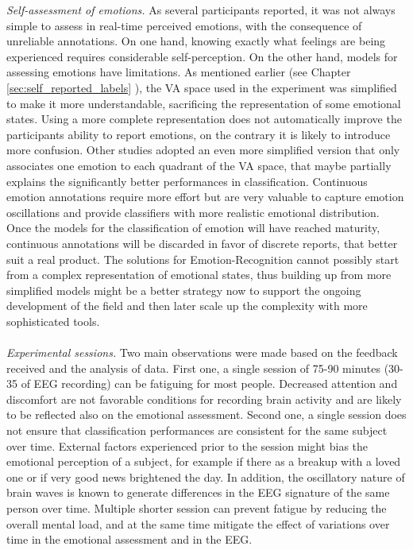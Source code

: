 \emph{Self-assessment of emotions.} As several participants reported, it was not always simple to assess in real-time perceived emotions, with the consequence of unreliable annotations. On one hand, knowing exactly what feelings are being experienced requires considerable self-perception. On the other hand, models for assessing emotions have limitations. As mentioned earlier (see Chapter \ref{sec:self_reported_labels} ), the \ac{VA} space used in the experiment was simplified to make it more understandable, sacrificing the representation of some emotional states. Using a more complete representation does not automatically improve the participants ability to report emotions, on the contrary it is likely to introduce more confusion. Other studies \cite{lin_eeg-based_2010} adopted an even more simplified version that only associates one emotion to each quadrant of the \ac{VA} space, that maybe partially explains the significantly better performances in classification. Continuous emotion annotations require more effort but are very valuable to capture emotion oscillations and provide classifiers with more realistic emotional distribution. Once the models for the classification of emotion will have reached maturity, continuous annotations will be discarded in favor of discrete reports, that better suit a real product. The solutions for Emotion-Recognition cannot possibly start from a complex representation of emotional states, thus building up from more simplified models might be a better strategy now to support the ongoing development of the field and then later scale up the complexity with more sophisticated tools.
\\
\\
\emph{Experimental sessions.} Two main observations were made based on the feedback received and the analysis of data. First one, a single session of 75-90 minutes (30-35 of \ac{EEG} recording) can be fatiguing for most people. Decreased attention and discomfort are not favorable conditions for recording brain activity and are likely to be reflected also on the emotional assessment. Second one, a single session does not ensure that classification performances are consistent for the same subject over time. External factors experienced prior to the session might bias the emotional perception of a subject, for example if there as a breakup with a loved one or if very good news brightened the day. In addition, the oscillatory nature of brain waves is known to generate differences in the \ac{EEG} signature of the same person over time. Multiple shorter session can prevent fatigue by reducing the overall mental load, and at the same time mitigate the effect of variations over time in the emotional assessment and in the \ac{EEG}.  
